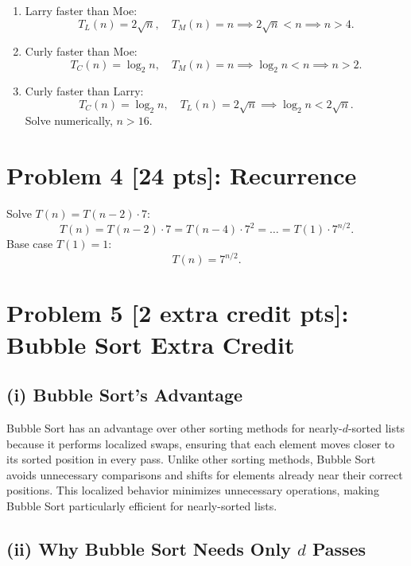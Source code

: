 \documentclass[10pt]{article}
\begin{document}
\begin{enumerate}
  \item Larry faster than Moe:
    \[
      T_L(n) = 2\sqrt{n}, \quad T_M(n) = n \implies 2\sqrt{n} < n \implies n > 4.
    \]

  \item Curly faster than Moe:
    \[
      T_C(n) = \log_2{n}, \quad T_M(n) = n \implies \log_2{n} < n \implies n > 2.
    \]

  \item Curly faster than Larry:
    \[
      T_C(n) = \log_2{n}, \quad T_L(n) = 2\sqrt{n} \implies \log_2{n} < 2\sqrt{n}.
    \]
    Solve numerically, \( n > 16 \).
\end{enumerate}

\newpage

\section*{Problem 4 [24 pts]: Recurrence}

Solve \( T(n) = T(n-2) \cdot 7 \):
\[
  T(n) = T(n-2) \cdot 7 = T(n-4) \cdot 7^2 = \dots = T(1) \cdot 7^{n/2}.
\]
Base case \( T(1) = 1 \):
\[
  T(n) = 7^{n/2}.
\]

\newpage

\section*{Problem 5 [2 extra credit pts]: Bubble Sort Extra Credit}

\subsection*{(i) Bubble Sort's Advantage}

Bubble Sort has an advantage over other sorting methods for nearly-\( d \)-sorted lists because it performs localized swaps, ensuring that each element moves closer to its sorted position in every pass. Unlike other sorting methods, Bubble Sort avoids unnecessary comparisons and shifts for elements already near their correct positions. This localized behavior minimizes unnecessary operations, making Bubble Sort particularly efficient for nearly-sorted lists.

\subsection*{(ii) Why Bubble Sort Needs Only \( d \) Passes}
\end{document}

